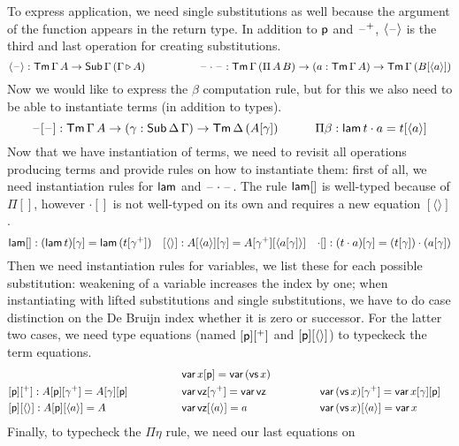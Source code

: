\documentclass{easychair}
\begin{document}
To express application, we need single substitutions as well because
the argument of the function appears in the return type. In addition
to $\mathsf{p}$ and $\mathord{\hspace{1pt}\text{--}\hspace{1pt}}^+$, $\langle\mathord{\hspace{1pt}\text{--}\hspace{1pt}}\rangle$ is the third and last
operation for creating substitutions.
\[
\langle\mathord{\hspace{1pt}\text{--}\hspace{1pt}}\rangle : \mathsf{Tm}\,\Gamma\,A\rightarrow\mathsf{Sub}\,\Gamma\,(\Gamma\mathop{\triangleright} A) \hspace{5em} \mathord{\hspace{1pt}\text{--}\hspace{1pt}}\cdot\mathord{\hspace{1pt}\text{--}\hspace{1pt}}: \mathsf{Tm}\,\Gamma\,(\Pi\,A\,B)\rightarrow(a:\mathsf{Tm}\,\Gamma\,A)\rightarrow\mathsf{Tm}\,\Gamma\,(B[\langle a\rangle])
\]
Now we would like to express the $\beta$ computation rule, but for
this we also need to be able to instantiate terms (in addition to
types).
\[
\mathord{\hspace{1pt}\text{--}\hspace{1pt}}[\mathord{\hspace{1pt}\text{--}\hspace{1pt}}] : \mathsf{Tm}\,\Gamma\,A\rightarrow(\gamma:\mathsf{Sub}\,\Delta\,\Gamma)\rightarrow\mathsf{Tm}\,\Delta\,(A[\gamma]) \hspace{3em} \Pi\beta : \mathsf{lam}\,t\cdot a = t[\langle a\rangle] 
\]
Now that we have instantiation of terms, we need to revisit all
operations producing terms and provide rules on how to instantiate
them: first of all, we need instantiation rules for $\mathsf{lam}$ and
$\mathord{\hspace{1pt}\text{--}\hspace{1pt}}\cdot\mathord{\hspace{1pt}\text{--}\hspace{1pt}}$. The rule $\mathsf{lam}[]$ is well-typed because of
$\Pi[]$, however ${\cdot}[]$ is not well-typed on its own and requires
a new equation $[\langle\rangle]$.
\[
\mathsf{lam}[] : (\mathsf{lam}\,t)[\gamma] = \mathsf{lam}\,(t[\gamma^+]) \hspace{1em} [\langle\rangle] : A[\langle a\rangle][\gamma] = A[\gamma^+][\langle a[\gamma]\rangle] \hspace{1em} {\cdot}[] : (t\cdot a)[\gamma] = (t[\gamma])\cdot(a[\gamma])
\]
Then we need instantiation rules for variables, we list these for each
possible substitution: weakening of a variable increases the index by
one; when instantiating with lifted substitutions and single
substitutions, we have to do case distinction on the De Bruijn index
whether it is zero or successor. For the latter two cases, we need
type equations (named $[\mathsf{p}][^+]$ and $[\mathsf{p}][\langle\rangle]$) to
typeckeck the term equations.
\begin{alignat*}{10}
  & && \var\,x[\p] = \var\,(\vs\,x) \\
  & [\p][^+] : A[\p][\gamma^+] = A[\gamma][\p] \hspace{4em}&& \var\,\vz[\gamma^+] = \var\,\vz \hspace{4em} && \var\,(\vs\,x)[\gamma^+] = \var\,x[\gamma][\p] \\
  & [\p][\langle\rangle] : A[\p][\langle a\rangle] = A && \var\,\vz[\langle a\rangle] = a &&  \var\,(\vs\,x)[\langle a\rangle] = \var\,x
\end{alignat*}
Finally, to typecheck the $\Pi\eta$ rule, we need our last equations on
\end{document}
